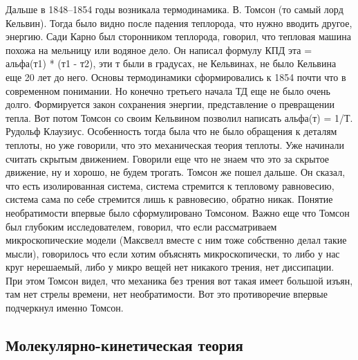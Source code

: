\documentclass[a4paper, 12pt]{article}
\begin{document}
Дальше в 1848--1854 годы возникала термодинамика. В. Томсон (то самый 
лорд Кельвин). Тогда было видно после падения теплорода, что нужно 
вводить другое, энергию. Сади Карно был сторонником теплорода, говорил, 
что тепловая машина похожа на мельницу или водяное дело. Он написал 
формулу КПД эта = альфа(т1) * (т1 - т2), эти т были в градусах, не 
Кельвинах, не было Кельвина еще 20 лет до него. Основы термодинамики 
сформировались к 1854 почти что в современном понимании. Но конечно 
третьего начала ТД еще не было очень долго. Формируется закон сохранения 
энергии, представление о превращении тепла. Вот потом Томсон со своим 
Кельвином позволил написать альфа(т) = 1/Т. Рудольф Клаузиус. 
Особенность тогда была что не было обращения к деталям теплоты, но уже 
говорили, что это механическая теория теплоты. Уже начинали считать 
скрытым движением. Говорили еще что не знаем что это за скрытое 
движение, ну и хорошо, не будем трогать. Томсон же пошел дальше. Он 
сказал, что есть изолированная система, система стремится к тепловому 
равновесию, система сама по себе стремится лишь к равновесию, обратно 
никак. Понятие необратимости впервые было сформулировано Томсоном. Важно 
еще что Томсон был глубоким исследователем, говорил, что если 
рассматриваем микроскопические модели (Максвелл вместе с ним тоже 
собственно делал такие мысли), говорилось что если хотим объяснять 
микроскопически, то либо у нас круг нерешаемый, либо у микро вещей нет 
никакого трения, нет диссипации. При этом Томсон видел, что механика без 
трения вот такая имеет большой изъян, там нет стрелы времени, нет 
необратимости. Вот это противоречие впервые подчеркнул именно Томсон.

\subsection{Молекулярно-кинетическая теория}
\end{document}
